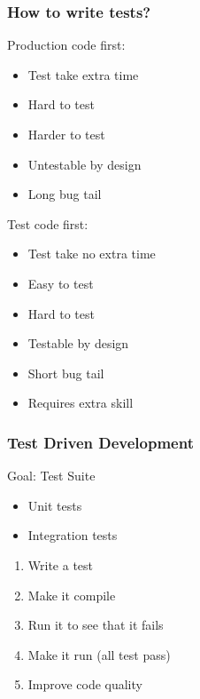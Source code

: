 
\begin{frame}
  \frametitle{How to write tests?}
  \begin{minipage}[t]{0.48\linewidth}
  \pause
  Production code first:\pause
  \begin{itemize}
     \item Test take extra time\pause
     \item Hard to test\pause
     \item Harder to test\pause
     \item Untestable by design\pause
     \item Long bug tail\pause
  \end{itemize}
  \end{minipage}\hfill
  \begin{minipage}[t]{0.48\linewidth}
  Test code first:\pause
  \begin{itemize}
     \item Test take no extra time\pause
     \item Easy to test\pause
     \item Hard to test\pause
     \item Testable by design\pause
     \item Short bug tail\pause
     \item Requires extra skill
  \end{itemize}
  \end{minipage}
\end{frame}

\begin{frame}
  \frametitle{Test Driven Development}
    \begin{minipage}[t]{0.48\linewidth}
        \pause
        Goal: Test Suite\pause
        \begin{itemize}
            \item Unit tests\pause
            \item Integration tests\pause
        \end{itemize}
    \end{minipage}\hfill
    \begin{minipage}[t]{0.48\linewidth}
        \begin{enumerate} 
            \item Write a test
            \item Make it compile
            \item Run it to see that it fails
            \item Make it run (all test pass)
            \item Improve code quality
         \end{enumerate} 
    \end{minipage}
\end{frame}


